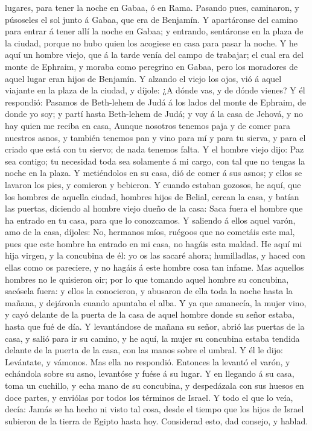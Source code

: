 lugares, para tener la noche en Gabaa, ó en Rama.  Pasando
pues, caminaron, y púsoseles el sol junto á Gabaa, que era de Benjamín.
 Y apartáronse del camino para entrar á tener allí la noche
en Gabaa; y entrando, sentáronse en la plaza de la ciudad, porque no
hubo quien los acogiese en casa para pasar la noche.  Y he
aquí un hombre viejo, que á la tarde venía del campo de trabajar; el
cual era del monte de Ephraim, y moraba como peregrino en Gabaa, pero
los moradores de aquel lugar eran hijos de Benjamín.  Y
alzando el viejo los ojos, vió á aquel viajante en la plaza de la
ciudad, y díjole: ¿A dónde vas, y de dónde vienes?  Y él
respondió: Pasamos de Beth-lehem de Judá á los lados del monte de
Ephraim, de donde yo soy; y partí hasta Beth-lehem de Judá; y voy á la
casa de Jehová, y no hay quien me reciba en casa,  Aunque
nosotros tenemos paja y de comer para nuestros asnos, y también tenemos
pan y vino para mí y para tu sierva, y para el criado que está con tu
siervo; de nada tenemos falta.  Y el hombre viejo dijo: Paz
sea contigo; tu necesidad toda sea solamente á mi cargo, con tal que no
tengas la noche en la plaza.  Y metiéndolos en su casa, dió
de comer á sus asnos; y ellos se lavaron los pies, y comieron y
bebieron.  Y cuando estaban gozosos, he aquí, que los
hombres de aquella ciudad, hombres hijos de Belial, cercan la casa, y
batían las puertas, diciendo al hombre viejo dueño de la casa: Saca
fuera el hombre que ha entrado en tu casa, para que lo conozcamos.
 Y saliendo á ellos aquel varón, amo de la casa, díjoles:
No, hermanos míos, ruégoos que no cometáis este mal, pues que este
hombre ha entrado en mi casa, no hagáis esta maldad.  He
aquí mi hija virgen, y la concubina de él: yo os las sacaré ahora;
humilladlas, y haced con ellas como os pareciere, y no hagáis á este
hombre cosa tan infame.  Mas aquellos hombres no le
quisieron oir; por lo que tomando aquel hombre su concubina, sacósela
fuera: y ellos la conocieron, y abusaron de ella toda la noche hasta la
mañana, y dejáronla cuando apuntaba el alba.  Y ya que
amanecía, la mujer vino, y cayó delante de la puerta de la casa de aquel
hombre donde su señor estaba, hasta que fué de día.  Y
levantándose de mañana su señor, abrió las puertas de la casa, y salió
para ir su camino, y he aquí, la mujer su concubina estaba tendida
delante de la puerta de la casa, con las manos sobre el umbral.
 Y él le dijo: Levántate, y vámonos. Mas ella no respondió.
Entonces la levantó el varón, y echándola sobre su asno, levantóse y
fuése á su lugar.  Y en llegando á su casa, toma un
cuchillo, y echa mano de su concubina, y despedázala con sus huesos en
doce partes, y enviólas por todos los términos de Israel. 
Y todo el que lo veía, decía: Jamás se ha hecho ni visto tal cosa, desde
el tiempo que los hijos de Israel subieron de la tierra de Egipto hasta
hoy. Considerad esto, dad consejo, y hablad.

